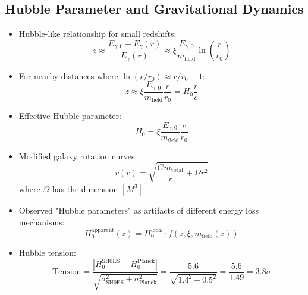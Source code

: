 \documentclass[12pt,a4paper]{article}
\begin{document}
\subsection{Hubble Parameter and Gravitational Dynamics}
\begin{itemize}
	\item Hubble-like relationship for small redshifts:
	\begin{equation}
		z \approx \frac{E_{\gamma,0} - E_\gamma(r)}{E_\gamma(r)} \approx \xi \frac{E_{\gamma,0}}{m_{\text{field}}} \ln\left(\frac{r}{r_0}\right)
	\end{equation}
	
	\item For nearby distances where $\ln(r/r_0) \approx r/r_0 - 1$:
	\begin{equation}
		z \approx \xi \frac{E_{\gamma,0}}{m_{\text{field}}} \frac{r}{r_0} = H_0 \frac{r}{c}
	\end{equation}
	
	\item Effective Hubble parameter:
	\begin{equation}
		H_0 = \xi \frac{E_{\gamma,0}}{m_{\text{field}}} \frac{c}{r_0}
	\end{equation}
	
	\item Modified galaxy rotation curves:
	\begin{equation}
		v(r) = \sqrt{\frac{Gm_{\text{total}}}{r} + \Omega r^2}
	\end{equation}
	where $\Omega$ has the dimension $[M^3]$
	
	\item Observed "Hubble parameters" as artifacts of different energy loss mechanisms:
	\begin{equation}
		H_0^{\text{apparent}}(z) = H_0^{\text{local}} \cdot f(z, \xi, m_{\text{field}}(z))
	\end{equation}
	
	\item Hubble tension:
	\begin{equation}
		\text{Tension} = \frac{|H_0^{\text{SH0ES}} - H_0^{\text{Planck}}|}{\sqrt{\sigma_{\text{SH0ES}}^2 + \sigma_{\text{Planck}}^2}} = \frac{5.6}{\sqrt{1.4^2 + 0.5^2}} = \frac{5.6}{1.49} = 3.8\sigma
	\end{equation}
\end{itemize}
\end{document}
